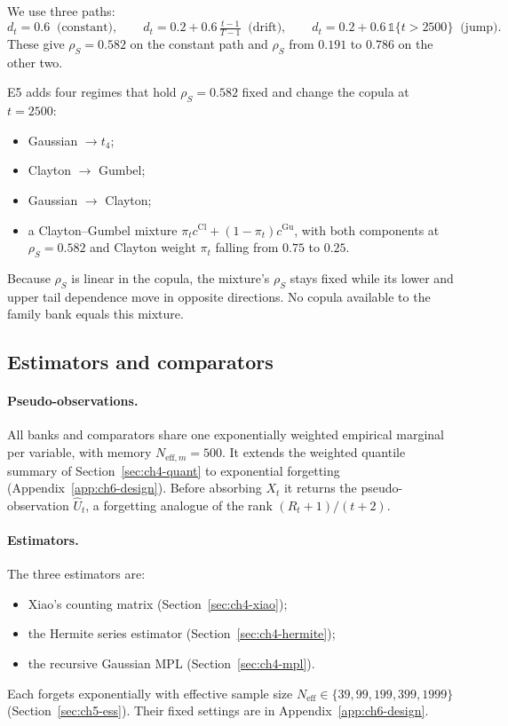 We use three paths:
\begin{equation}\label{eq:ch6-paths}
  d_t = 0.6 \;\;\text{(constant)}, \qquad
  d_t = 0.2 + 0.6\,\tfrac{t-1}{T-1} \;\;\text{(drift)}, \qquad
  d_t = 0.2 + 0.6\,\mathbb 1\{t > 2500\} \;\;\text{(jump)}.
\end{equation}
These give $\rho_S = 0.582$ on the constant path and $\rho_S$ from $0.191$ to $0.786$ on the other two.

E5 adds four regimes that hold $\rho_S = 0.582$ fixed and change the copula at $t = 2500$:
\begin{itemize}
  \item Gaussian $\to t_4$;
  \item Clayton $\to$ Gumbel;
  \item Gaussian $\to$ Clayton;
  \item a Clayton--Gumbel mixture $\pi_t c^{\mathrm{Cl}} + (1-\pi_t) c^{\mathrm{Gu}}$, with both components at $\rho_S = 0.582$ and Clayton weight $\pi_t$ falling from $0.75$ to $0.25$.
\end{itemize}
Because $\rho_S$ is linear in the copula, the mixture's $\rho_S$ stays fixed while its lower and upper tail dependence move in opposite directions.
No copula available to the family bank equals this mixture.

\subsection{Estimators and comparators}\label{sec:ch6-methods}

\paragraph{Pseudo-observations.}
All banks and comparators share one exponentially weighted empirical marginal per variable, with memory $N_{\mathrm{eff},m} = 500$.
It extends the weighted quantile summary of Section~\ref{sec:ch4-quant} to exponential forgetting (Appendix~\ref{app:ch6-design}).
Before absorbing $X_t$ it returns the pseudo-observation $\widehat U_t$, a forgetting analogue of the rank $(R_t + 1)/(t + 2)$.

\paragraph{Estimators.}
The three estimators are:
\begin{itemize}
  \item Xiao's counting matrix (Section~\ref{sec:ch4-xiao});
  \item the Hermite series estimator (Section~\ref{sec:ch4-hermite});
  \item the recursive Gaussian MPL (Section~\ref{sec:ch4-mpl}).
\end{itemize}
Each forgets exponentially with effective sample size $N_{\mathrm{eff}} \in \{39, 99, 199, 399, 1999\}$ (Section~\ref{sec:ch5-ess}).
Their fixed settings are in Appendix~\ref{app:ch6-design}.

